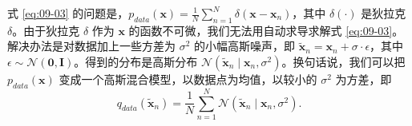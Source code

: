 式 \eqref{eq:09-03} 的问题是，$p_{\mathit{data}}(\mathbf x)=\frac1N\sum_{n=1}^{N}\delta(\mathbf x-\mathbf x_n)$，其中 $\delta(\cdot)$ 是狄拉克 $\delta$。由于狄拉克 $\delta$ 作为 $\mathbf x$ 的函数不可微，我们无法用自动求导求解式 \eqref{eq:09-03}。解决办法是对数据加上一些方差为 $\sigma^2$ 的小幅高斯噪声，即 $\tilde{\mathbf x}_n=\mathbf x_n+\sigma\cdot\epsilon$，其中 $\epsilon\sim\mathcal N(\mathbf 0,\mathbf I)$。得到的分布是高斯分布 $\mathcal N(\tilde{\mathbf x}_n\mid\mathbf x_n,\sigma^2)$。换句话说，我们可以把 $p_{\mathit{data}}(\mathbf x)$ 变成一个高斯混合模型，以数据点为均值，以较小的 $\sigma^2$ 为方差，即
\begin{equation}
  q_{\mathit{data}}(\tilde{\mathbf x}_n)=\frac1N\sum_{n=1}^{N}
    \mathcal N(\tilde{\mathbf x}_n\mid\mathbf x_n,\sigma^2).
  \tag{9.4}\label{eq:09-04}
\end{equation}

